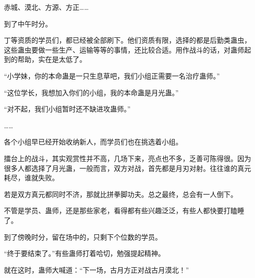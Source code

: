 \begin{this_body}
赤城、漠北、方源、方正……

到了中午时分。

丁等资质的学员们，都已经被全部刷下。他们资质有限，选择的都是后勤类蛊虫，这些蛊虫要做一些生产、运输等等的事情，还比较合适。用作战斗的话，对蛊师起到的帮助，实在是太低了。

“小学妹，你的本命蛊是一只生息草吧，我们小组正需要一名治疗蛊师。”

“这位学长，我想加入你们的小组，我的本命蛊是月光蛊。”

“对不起，我们小组暂时还不缺进攻蛊师。”

……

各个小组早已经开始收纳新人，而学员们也在挑选着小组。

擂台上的战斗，其实观赏性并不高，几场下来，亮点也不多，乏善可陈得很。因为很多人都选择了月光蛊，一般而言，双方对战，首先都是月刃对射。往往谁的真元耗尽，谁就失败。

若是双方真元都同时不济，那就比拼拳脚功夫。总之最终，总会有一人倒下。

不管是学员、蛊师，还是那些家老，看得都有些兴趣泛泛，有些人都快要打瞌睡了。

到了傍晚时分，留在场中的，只剩下个位数的学员。

“终于要结束了。”有些蛊师打着哈切，勉强提起精神。

就在这时，蛊师大喊道：“下一场，古月方正对战古月漠北！”

\end{this_body}

